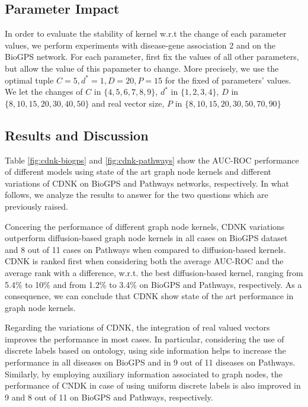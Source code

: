 \documentclass[review]{elsarticle}
\begin{document}
\subsection{Parameter Impact}
In order to evaluate the stability of kernel w.r.t the change of each parameter values, we perform experiments with disease-gene association 2 and on the BioGPS network. For each parameter, first fix the values of all other parameters, but allow the value of this papameter to change. More precisely, we use the optimal tuple $C = 5, d^* = 1, D = 20, P = 15$ for the fixed of parameters' values. We let the changes of $C$ in $\lbrace 4, 5, 6, 7, 8, 9\rbrace$, $d^*$ in $\lbrace 1, 2, 3, 4\rbrace$, $D$ in $\lbrace 8, 10,  15, 20, 30, 40, 50\rbrace$ and real vector size, $P$ in $\lbrace 8, 10,  15, 20, 30, 50, 70, 90\rbrace$

\subsection{Results and Discussion}
Table \ref{fig:cdnk-biogps} and \ref{fig:cdnk-pathways} show the AUC-ROC performance of different models using state of the art graph node kernels and different variations of CDNK on BioGPS and Pathways networks, respectively. In what follows, we analyze the results to answer for the two questions which are previously raised.

Concering the performance of different graph node kernels, CDNK variations outperform diffusion-based graph node kernels in all cases on BioGPS dataset and 8 out of 11 cases on Pathways when compared to diffusion-based kernels. CDNK is ranked first when considering both the average AUC-ROC and the average rank with a difference, w.r.t. the best diffusion-based kernel, ranging from 5.4$\%$ to 10$\%$ and from 1.2$\%$ to 3.4$\%$ on BioGPS and Pathways, respectively. As a consequence, we can conclude that CDNK show state of the art performance in graph node kernels.

Regarding the variations of CDNK, the integration of real valued vectors improves the performance in most cases. In particular, considering the use of discrete labels based on ontology, using side information helps to increase the performance in all diseases on BioGPS and in 9 out of 11 diseases on Pathways. Similarly, by employing auxiliary information associated to graph nodes, the performance of CNDK in case of using uniform discrete labels is also improved in 9 and 8 out of 11 on BioGPS and Pathways, respectively.
\end{document}
